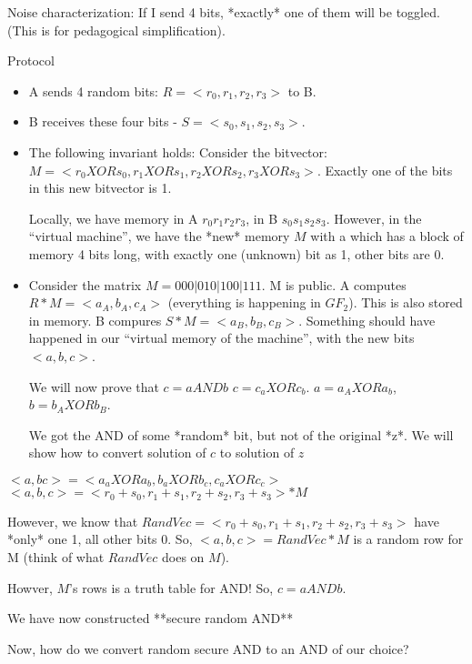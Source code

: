 Noise characterization: If I send 4 bits, *exactly* one of them will be toggled.
(This is for pedagogical simplification).

Protocol

\begin{itemize}
\item A sends 4 random bits: $R = < r_0, r_1, r_2, r_3 >$ to B.
\item B receives these four bits - $ S = < s_0, s_1, s_2, s_3 >$.
\item The following invariant holds: Consider the bitvector:
  $ M =  <r_0 XOR s_0, r_1 XOR s_1, r_2 XOR s_2, r_3 XOR s_3 > $. Exactly one of the bits in this new bitvector is 1.

  Locally, we have memory in A $r_0 r_1 r_2 r_3$, in B $s_0 s_1 s_2 s_3$. However, in the ``virtual machine'', we have
  the *new* memory $M$ with a which has a block of memory 4 bits long, with exactly one (unknown) bit as 1,
  other bits are 0.

\item Consider the matrix $M = 0 0 0 | 0 1 0 | 1 0 0 | 1 1 1$. M is public.
  A computes $R * M = <a_A, b_A, c_A>$ (everything is happening in $GF_2$). This is also stored in memory.
  B compures $S * M = <a_B, b_B, c_B>$. Something should have happened in our ``virtual memory of the machine'', with the
  new bits $<a, b, c>$.

  We will now prove that $c = a AND b$ $c = c_a XOR c_b$. $a = a_A XOR a_b$, $b = b_A XOR b_B$.

  We got the AND of some *random* bit, but not of the original *z*. We will show how to convert solution of $c$ to solution of $z$
\end{itemize}


$<a, b c> = <a_a XOR a_b, b_a XOR b_c, c_a XOR c_c>$
$<a, b, c> = <r_0 + s_0, r_1 + s_1, r_2 + s_2, r_3 + s_3> * M$

However, we know that $RandVec = <r_0 + s_0, r_1 + s_1, r_2 + s_2, r_3 + s_3>$ have *only* one 1, all other bits 0.
So, $<a, b, c> = RandVec * M$ is a random row for M (think of what $RandVec$ does on $M$).

Howver, $M$'s rows is a truth table for AND! So, $c = a AND b$.

We have now constructed **secure random AND**


Now, how do we convert random secure AND to an AND of our choice?







